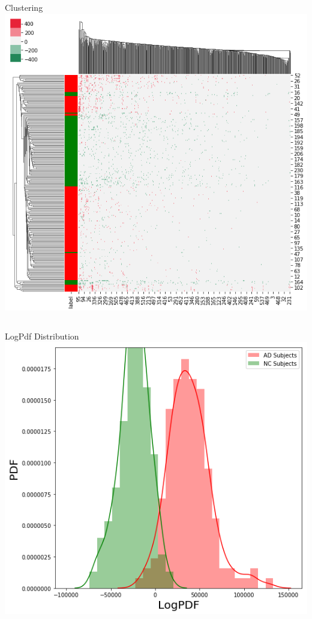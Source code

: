 \documentclass{beamer}
\begin{document}
\begin{frame}
\begin {columns}
\begin{column}{0.8\linewidth}
\begin{block}{Clustering}
\centering
\includegraphics[scale=0.38]{diff-logpdf-clustering10}

\end{block}


\end{column}
\end{columns}
\end{frame}

\begin{frame}
\begin {columns}
\begin{column}{0.8\linewidth}
\begin{block}{LogPdf Distribution}
\centering
\includegraphics[scale=0.45]{logpdf-dist}

\end{block}


\end{column}
\end{columns}
\end{frame}
\end{document}
